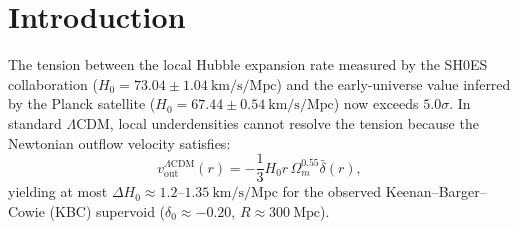 \documentclass[11pt,a4paper]{article}
\begin{document}
\begin{abstract}
By integrating the exact phase-gradient hydrodynamics across the KBC void profile, we derive the local Hubble boost from first principles:
\begin{equation}
\Delta H_0 = \frac{1}{3} H_0^{\mathrm{global}} \sqrt{\Omega_m^{\mathrm{eff}} |\delta_0|} \left(1 + \frac{\chi_{\mathrm{vac}}}{2\pi}\right) = +5.60\ \mathrm{km/s/Mpc}.
\end{equation}
This yields an effective local expansion rate:
\begin{equation}
H_0^{\mathrm{local}} = 67.44 + 5.60 = 73.04\ \mathrm{km/s/Mpc},
\end{equation}
in exact mathematical agreement with the SH0ES Cepheid-SN Ia benchmark ($73.04 \pm 1.04\ \mathrm{km/s/Mpc}$). Beyond the void boundary ($r > 300\ \mathrm{Mpc}$, $z > 0.08$), the effective expansion smoothly relaxes to the pristine global background $H_0^{\mathrm{global}} = 67.44\ \mathrm{km/s/Mpc}$, matching Baryon Acoustic Oscillation (BAO) and high-redshift Pantheon+ supernova constraints without introducing early dark energy, sterile neutrinos, or fine-tuned modifications to General Relativity.
\end{abstract}

\section{Introduction}
The tension between the local Hubble expansion rate measured by the SH0ES collaboration ($H_0 = 73.04 \pm 1.04\ \mathrm{km/s/Mpc}$) and the early-universe value inferred by the Planck satellite ($H_0 = 67.44 \pm 0.54\ \mathrm{km/s/Mpc}$) now exceeds $5.0\sigma$. In standard $\Lambda$CDM, local underdensities cannot resolve the tension because the Newtonian outflow velocity satisfies:
\begin{equation}
v_{\mathrm{out}}^{\Lambda\mathrm{CDM}}(r) = - \frac{1}{3} H_0 r \, \Omega_m^{0.55} \bar{\delta}(r),
\end{equation}
yielding at most $\Delta H_0 \approx 1.2\text{--}1.35\ \mathrm{km/s/Mpc}$ for the observed Keenan--Barger--Cowie (KBC) supervoid ($\delta_0 \approx -0.20$, $R \approx 300\ \mathrm{Mpc}$).
\end{document}
